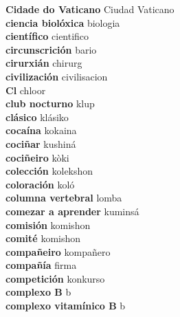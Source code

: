 \textbf{ Cidade do Vaticano  } Ciudad Vaticano \\
\textbf{ ciencia biolóxica  } biologia \\
\textbf{ científico  } cientifico \\
\textbf{ circunscrición  } bario \\
\textbf{ cirurxián  } chirurg \\
\textbf{ civilización  } civilisacion \\
\textbf{ Cl  } chloor \\
\textbf{ club nocturno  } klup \\
\textbf{ clásico  } klásiko \\
\textbf{ cocaína  } kokaina \\
\textbf{ cociñar  } kushiná \\
\textbf{ cociñeiro  } kòki \\
\textbf{ colección  } kolekshon \\
\textbf{ coloración  } koló \\
\textbf{ columna vertebral  } lomba \\
\textbf{ comezar a aprender  } kuminsá \\
\textbf{ comisión  } komishon \\
\textbf{ comité  } komishon \\
\textbf{ compañeiro  } kompañero \\
\textbf{ compañía  } firma \\
\textbf{ competición  } konkurso \\
\textbf{ complexo B  } b \\
\textbf{ complexo vitamínico B  } b \\

